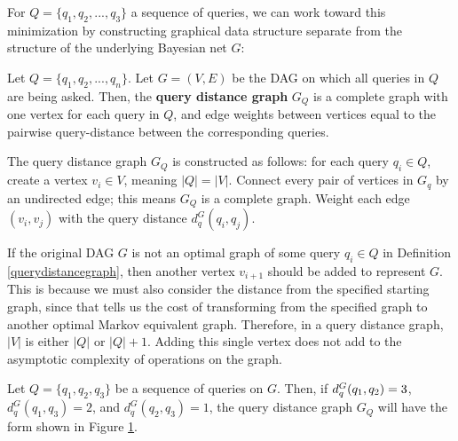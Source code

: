 \null \quad \quad For $Q = \{q_{1}, q_{2}, ..., q_{3}\}$ a sequence of queries, we can work toward this minimization by constructing graphical data structure separate from the structure of the underlying Bayesian net $G$:

\begin{definition}\label{querydistancegraph}
Let $Q= \{q_{1}, q_{2}, ..., q_{n}\}$. Let $G=(V,E)$ be the DAG on which all queries in $Q$ are being asked. Then, the \textbf{query distance graph} $G_{Q}$ is a complete graph with one vertex for each query in $Q$, and edge weights between vertices equal to the pairwise query-distance between the corresponding queries. 
\end{definition}

\begin{remark}
The query distance graph $G_{Q}$ is constructed as follows: for each query $q_{i} \in Q$, create a vertex $v_{i} \in V$, meaning $|Q| = |V|$. Connect every pair of vertices in $G_{q}$ by an undirected edge; this means $G_{Q}$ is a complete graph. Weight each edge $(v_{i}, v_{j})$ with the query distance $d_{q}^{G}(q_{i}, q_{j})$. 
\end{remark}

\begin{remark}
If the original DAG $G$ is not an optimal graph of some query $q_{i} \in Q$ in Definition \ref{querydistancegraph}, then another vertex $v_{i+1}$ should be added to represent $G$. This is because we must also consider the distance from the specified starting graph, since that tells us the cost of transforming from the specified graph to another optimal Markov equivalent graph.  Therefore, in a query distance graph, $|V|$ is either $|Q|$ or $|Q|+1$. Adding this single vertex does not add to the asymptotic complexity of operations on the graph. 
\end{remark}

\begin{example} Let $Q = \{q_{1}, q_{2}, q_{3}\}$ be a sequence of queries on $G$. Then, if $d_{q}^{G}(q_{1}, q_{2}) \\ = 3$, $d_{q}^{G}(q_{1}, q_{3}) = 2$, and $d_{q}^{G}(q_{2}, q_{3}) = 1$, the query distance graph $G_{Q}$ will have the form shown in Figure \ref{fig:querydistancegraphex}.
\begin{figure}[h!]
\centering
{}
\caption{}
\label{fig:querydistancegraphex}
\end{figure}
\end{example}

